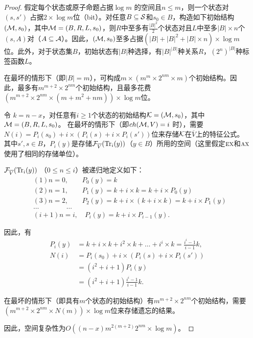 \begin{proof}
	假定每个状态或原子命题占据$\log m$ 的空间且$n\leq m$，则一个状态对$(s,s')$ 占据$2\times \log m$位（bit）。对任意$B \subseteq {\cal S}$和$s_0\in B$，构造如下初始结构$({\cal M},s_0)$，其中${\cal M} = (B,R,L,s_0)$，则$R$中至多有$\frac{|B|^2}{2}$个状态对且$L$中至多$|B|\times n$个$(s,A)$对（$A\subseteq {\cal A}$）。因此，$({\cal M},s_0)$至多占据$(|B|+|B|^2+|B|\times n)\times \log m$ 位。此外，对于状态集$B$，初始状态有$|B|$种选择，有$|B|^{|B|}$种关系$R$，$(2^n)^{|B|}$种标签函数$L$。
	
	在最坏的情形下（即$|B|=m$），可构成$m \times  (m^m \times  2^{nm} \times  m)$个初始结构。因此，最多有$m^{m+2} \times  2^{nm}$个初始结构，且最多花费$(m^{m+2} \times  2^{nm} \times  (m + m^2 + nm))\times  \log m$位。
	
	令 $k = n-x$，对任意有$i\geq 1$个状态的初始结构${\cal K} = ({\cal M},s_0)$，其中${\cal M} = (B,R,L,s_0)$。
	在最坏的情形下（即$ch({\cal M},V) = i$ 时），需要$N(i) = P_i(s_0) + i \times  (P_i(s) + i \times P_i(s'))$位来存储${\cal K}$在$\overline{V}$上的特征公式。
	其中$s',s\in B$，$P_i(y)$是存储${\cal F}_{\overline{V}}(\textrm{Tr}_i(y))$（$y\in B$）所用的空间（这里假定$\textsc{e}\textsc{x}$和$\textsc{a}\textsc{x}$使用了相同的存储单位）。
	
	${\cal F}_{\overline{V}}(\textrm{Tr}_i(y))$ （$0\leq n \leq i$）被递归地定义如下：
	\begin{align*}
		&(1) n=0,  \qquad P_0(y) = k\\
		&(2) n=1, \qquad  P_1(y) = k + i\times k = k + i\times P_0(y)\\
		&(3) n=2, \qquad P_2(y) = k + i\times (k + i\times k) = k+i\times P_1(y)\\
		& \dots \qquad \qquad \dots\\
		&(i+1) n = i, \quad P_i(y) = k + i \times  P_{i-1}(y).
	\end{align*}
	
	因此，有
	\begin{align*}
		P_i(y) & = k + i\times k + i^2 \times  k + \dots + i^i \times  k = \frac{i^i -1}{i-1} k,\\
		N(i) & = P_i(s_0) + i\times  (P_i(s) + i \times  P_i(s'))\\
		& = (i^2 + i +1) P_i(y) \\
		& = (i^2 + i+1)\frac{i^i -1}{i-1} k.
	\end{align*}
	
	在最坏的情形下（即具有$m$个状态的初始结构）有$m^{m+2} \times  2^{nm}$个初始结构，需要$(m^{m+2} \times  2^{nm} \times  N(m)) \times  \log m$位来存储遗忘的结果。
	
	因此，空间复杂性为$O((n-x)m^{2(m+2)}2^{nm}\times  \log m)$。
\end{proof}


